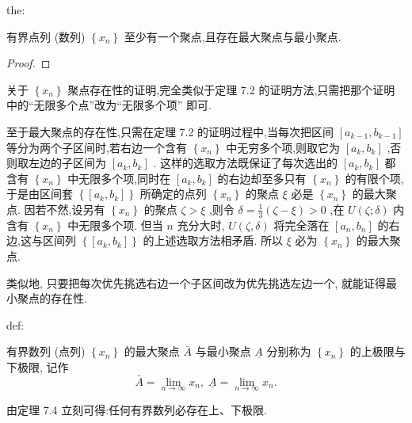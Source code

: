 \begin{theorem}{}{the:}

\end{theorem}
 有界点列 (数列) \(\left\{  {x}_{n}\right\}\) 至少有一个聚点,且存在最大聚点与最小聚点.

\begin{proof}

\end{proof}
关于 \(\left\{  {x}_{n}\right\}\) 聚点存在性的证明,完全类似于定理 7.2 的证明方法,只需把那个证明中的“无限多个点”改为“无限多个项” 即可.

至于最大聚点的存在性,只需在定理 7.2 的证明过程中,当每次把区间 \(\left\lbrack  {{a}_{k - 1},{b}_{k - 1}}\right\rbrack\) 等分为两个子区间时,若右边一个含有 \(\left\{  {x}_{n}\right\}\) 中无穷多个项,则取它为 \(\left\lbrack  {{a}_{k},{b}_{k}}\right\rbrack\) ,否则取左边的子区间为 \(\left\lbrack  {{a}_{k},{b}_{k}}\right\rbrack\) . 这样的选取方法既保证了每次选出的 \(\left\lbrack  {{a}_{k},{b}_{k}}\right\rbrack\) 都含有 \(\left\{  {x}_{n}\right\}\) 中无限多个项,同时在 \(\left\lbrack  {{a}_{k},{b}_{k}}\right\rbrack\) 的右边却至多只有 \(\left\{  {x}_{n}\right\}\) 的有限个项,于是由区间套 \(\left\{  \left\lbrack  {{a}_{k},{b}_{k}}\right\rbrack  \right\}\) 所确定的点列 \(\left\{  {x}_{n}\right\}\) 的聚点 \(\xi\) 必是 \(\left\{  {x}_{n}\right\}\) 的最大聚点. 因若不然,设另有 \(\left\{  {x}_{n}\right\}\) 的聚点 \(\zeta  > \xi\) ,则令 \(\delta  = \frac{1}{3}\left( {\zeta  - \xi }\right)  > 0\) ,在 \(U\left( {\zeta ;\delta }\right)\) 内含有 \(\left\{  {x}_{n}\right\}\) 中无限多个项. 但当 \(n\) 充分大时, \(U\left( {\zeta ,\delta }\right)\) 将完全落在 \(\left\lbrack  {{a}_{n},{b}_{n}}\right\rbrack\) 的右边,这与区间列 \(\left\{  \left\lbrack  {{a}_{k},{b}_{k}}\right\rbrack  \right\}\) 的上述选取方法相矛盾. 所以 \(\xi\) 必为 \(\left\{  {x}_{n}\right\}\) 的最大聚点.

类似地, 只要把每次优先挑选右边一个子区间改为优先挑选左边一个, 就能证得最小聚点的存在性.

\begin{definition}{}{def:}

\end{definition}
有界数列 (点列) \(\left\{  {x}_{n}\right\}\) 的最大聚点 \(\bar{A}\) 与最小聚点 \(\underline{A}\) 分别称为 \(\left\{  {x}_{n}\right\}\) 的上极限与下极限, 记作
\[
\bar{A} = \mathop{\lim }\limits_{{n \rightarrow  \infty }}{x}_{n},\;\underline{A} = \mathop{\lim }\limits_{{n \rightarrow  \infty }}{x}_{n}.
\]


由定理 7.4 立刻可得:任何有界数列必存在上、下极限.

